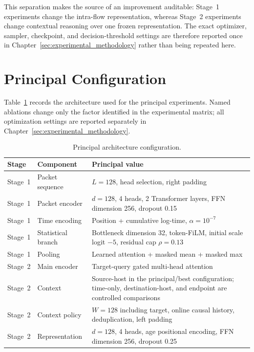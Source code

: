 \documentclass[11pt,fleqn]{report}
\begin{document}
This separation makes the source of an improvement auditable: Stage~1
experiments change the intra-flow representation, whereas Stage~2 experiments
change contextual reasoning over one frozen representation. The exact
optimizer, sampler, checkpoint, and decision-threshold settings are therefore
reported once in Chapter~\ref{sec:experimental_methodology} rather than being
repeated here.

\section{Principal Configuration}
\label{subsec:principal_configuration}

Table~\ref{tab:principal_method_config} records the architecture used for the
principal experiments. Named ablations change only the factor identified in the
experimental matrix; all optimization settings are reported separately in
Chapter~\ref{sec:experimental_methodology}.

\begin{table}[H]
    \centering
    \caption{Principal architecture configuration.}
    \label{tab:principal_method_config}
    \small
    \begin{tabular}{@{}p{2.0cm}p{4.4cm}p{7.6cm}@{}}
        \toprule
        Stage & Component & Principal value \\
        \midrule
        Stage~1 & Packet sequence & $L=128$, head selection, right padding \\
        Stage~1 & Packet encoder & $d=128$, 4 heads, 2 Transformer layers,
        FFN dimension 256, dropout 0.15 \\
        Stage~1 & Time encoding & Position + cumulative log-time,
        $\alpha=10^{-7}$ \\
        Stage~1 & Statistical branch & Bottleneck dimension 32, token-FiLM,
        initial scale logit $-5$, residual cap $\rho=0.13$ \\
        Stage~1 & Pooling & Learned attention + masked mean + masked max \\
        \midrule
        Stage~2 & Main encoder & Target-query gated multi-head attention \\
        Stage~2 & Context & Source-host in the principal/best configuration;
        time-only, destination-host, and endpoint are controlled comparisons \\
        Stage~2 & Context policy & $W=128$ including target, online causal
        history, deduplication, left padding \\
        Stage~2 & Representation & $d=128$, 4 heads, age positional encoding,
        FFN dimension 256, dropout 0.25 \\
        \bottomrule
    \end{tabular}
\end{table}
\end{document}
